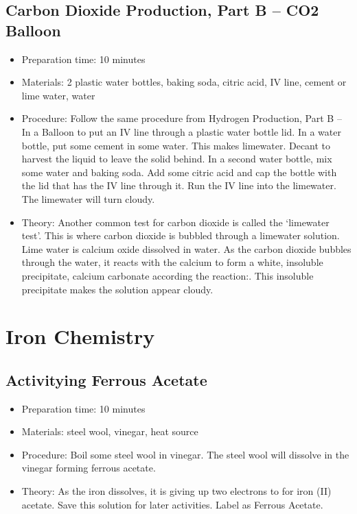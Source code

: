 \subsection{Carbon Dioxide Production, Part B – CO2 Balloon}
\begin{itemize}
\item{Preparation time: 10 minutes}
\item{Materials: 2 plastic water bottles, baking soda, citric acid, IV line, cement or lime water, water}
\item{Procedure: Follow the same procedure from Hydrogen Production, Part B – In a Balloon to put an IV line through a plastic water bottle lid. In a water bottle, put some cement in some water. This makes limewater. Decant to harvest the liquid to leave the solid behind. In a second water bottle, mix some water and baking soda. Add some citric acid and cap the bottle with the lid that has the IV line through it. Run the IV line into the limewater. The limewater will turn cloudy.}
\item{Theory: Another common test for carbon dioxide is called the ‘limewater test’. This is where carbon dioxide is bubbled through a limewater solution. Lime water is calcium oxide dissolved in water. As the carbon dioxide bubbles through the water, it reacts with the calcium to form a white, insoluble precipitate, calcium carbonate according the reaction:. This insoluble precipitate makes the solution appear cloudy. }
\end{itemize}

\section{Iron Chemistry}

\subsection{Activitying Ferrous Acetate}
\begin{itemize}
\item{Preparation time: 10 minutes}
\item{Materials: steel wool, vinegar, heat source}
\item{Procedure: Boil some steel wool in vinegar. The steel wool will dissolve in the vinegar forming ferrous acetate.}
\item{Theory: As the iron dissolves, it is giving up two electrons to for iron (II) acetate. Save this solution for later activities. Label as Ferrous Acetate.}
\end{itemize}

